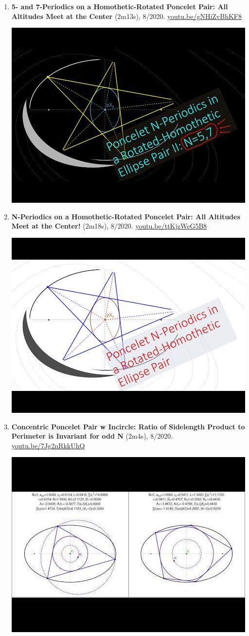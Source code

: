 \documentclass[12pt]{article}
\begin{document}
\begin{enumerate}[resume]
% 
\item \textbf{5- and 7-Periodics on a Homothetic-Rotated Poncelet Pair: All Altitudes Meet at the Center} (2m13s), 8/2020. \href{https://youtu.be/gNHiZvBhKF8}{\url{youtu.be/gNHiZvBhKF8}}
\begin{center}\includegraphics[width=.5\textwidth]{pics/gNHiZvBhKF8.jpg}\end{center}
% 
\item \textbf{N-Periodics on a Homothetic-Rotated Poncelet Pair: All Altitudes Meet at the Center!} (2m18s), 8/2020. \href{https://youtu.be/ttKjzWeG5B8}{\url{youtu.be/ttKjzWeG5B8}}
\begin{center}\includegraphics[width=.5\textwidth]{pics/ttKjzWeG5B8.jpg}\end{center}
% 
\item \textbf{Concentric Poncelet Pair w Incircle: Ratio of Sidelength Product to Perimeter is Invariant for odd N} (2m4s), 8/2020. \href{https://youtu.be/7Jg2nRkkUhQ}{\url{youtu.be/7Jg2nRkkUhQ}}
\begin{center}\includegraphics[width=.5\textwidth]{pics/7Jg2nRkkUhQ.jpg}\end{center}

\end{enumerate}
\end{document}
